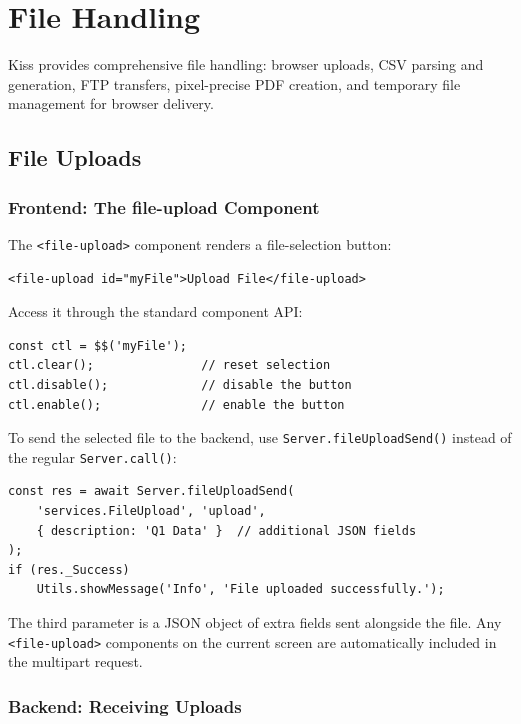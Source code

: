 \chapter{File Handling}
\label{ch:files}

Kiss provides comprehensive file handling: browser uploads, CSV parsing and generation, FTP transfers, pixel-precise PDF creation, and temporary file management for browser delivery.

\section{File Uploads}
\label{sec:file-upload}

\subsection{Frontend: The file-upload Component}

The \texttt{<file-upload>} component renders a file-selection button:

\begin{lstlisting}[style=html]
<file-upload id="myFile">Upload File</file-upload>
\end{lstlisting}

\noindent
Access it through the standard component API:

\begin{lstlisting}[style=javascript]
const ctl = $$('myFile');
ctl.clear();               // reset selection
ctl.disable();             // disable the button
ctl.enable();              // enable the button
\end{lstlisting}

\noindent
To send the selected file to the backend, use \texttt{Server.fileUploadSend()} instead of the regular \texttt{Server.call()}:

\begin{lstlisting}[style=javascript]
const res = await Server.fileUploadSend(
    'services.FileUpload', 'upload',
    { description: 'Q1 Data' }  // additional JSON fields
);
if (res._Success)
    Utils.showMessage('Info', 'File uploaded successfully.');
\end{lstlisting}

\noindent
The third parameter is a JSON object of extra fields sent alongside the file.  Any \texttt{<file-upload>} components on the current screen are automatically included in the multipart request.

\subsection{Backend: Receiving Uploads}

